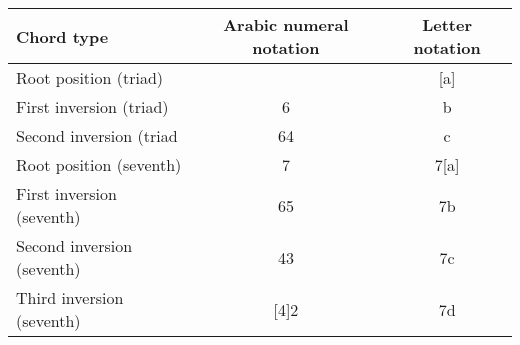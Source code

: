 \begin{tabular}{l|c|c}
Chord type & Arabic numeral notation & Letter notation
\\ \hline
Root position (triad) &  & [a] \\
First inversion (triad) & 6 & b \\
Second inversion (triad & 64 & c \\
Root position (seventh) & 7 & 7[a] \\
First inversion (seventh) & 65 & 7b \\
Second inversion (seventh) & 43 & 7c \\
Third inversion (seventh) & [4]2 & 7d
\end{tabular}

